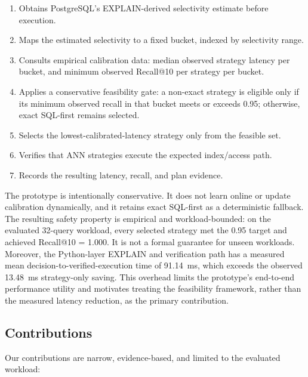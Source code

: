 \documentclass[10pt,twocolumn]{article}
\begin{document}
\begin{enumerate}
\item Obtains PostgreSQL's EXPLAIN-derived selectivity estimate before execution.
\item Maps the estimated selectivity to a fixed bucket, indexed by selectivity range.
\item Consults empirical calibration data: median observed strategy latency per bucket, and minimum observed Recall@10 per strategy per bucket.
\item Applies a conservative feasibility gate: a non-exact strategy is eligible only if its minimum observed recall in that bucket meets or exceeds 0.95; otherwise, exact SQL-first remains selected.
\item Selects the lowest-calibrated-latency strategy only from the feasible set.
\item Verifies that ANN strategies execute the expected index/access path.
\item Records the resulting latency, recall, and plan evidence.
\end{enumerate}

The prototype is intentionally conservative. It does not learn online or update calibration dynamically, and it retains exact SQL-first as a deterministic fallback. The resulting safety property is empirical and workload-bounded: on the evaluated 32-query workload, every selected strategy met the 0.95 target and achieved Recall@10 = 1.000. It is not a formal guarantee for unseen workloads. Moreover, the Python-layer EXPLAIN and verification path has a measured mean decision-to-verified-execution time of 91.14~ms, which exceeds the observed 13.48~ms strategy-only saving. This overhead limits the prototype's end-to-end performance utility and motivates treating the feasibility framework, rather than the measured latency reduction, as the primary contribution.

\subsection{Contributions}

Our contributions are narrow, evidence-based, and limited to the evaluated workload:
\end{document}
